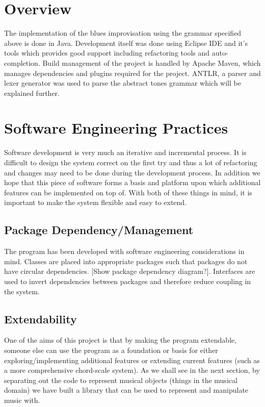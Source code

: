 \documentclass[pdftex,12pt,a4paper]{report}
\begin{document}
\section{Overview}
The implementation of the blues improvisation using the grammar specified above is done in Java. Development itself was done using Eclipse IDE and it's tools which provides good support including refactoring tools and auto-completion. Build management of the project is handled by Apache Maven, which manages dependencies and plugins required for the project. ANTLR, a parser and lexer generator was used to parse the abstract tones grammar which will be explained further.

\section{Software Engineering Practices}
Software development is very much an iterative and incremental process. It is difficult to design the system correct on the first try and thus a lot of refactoring and changes may need to be done during the development process. In addition we hope that this piece of software forms a basis and platform upon which additional features can be implemented on top of. With both of these things in mind, it is important to make the system flexible and easy to extend. 

\subsection{Package Dependency/Management}
The program has been developed with software engineering considerations in mind. Classes are placed into appropriate packages such that packages do not have circular dependencies. [Show package dependency diagram?]. Interfaces are used to invert dependencies between packages and therefore reduce coupling in the system. 

\subsection{Extendability}
One of the aims of this project is that by making the program extendable, someone else can use the program as a foundation or basis for either exploring/implementing additional features or extending current features (such as a more comprehensive chord-scale system). As we shall see in the next section, by separating out the code to represent musical objects (things in the musical domain) we have built a library that can be used to represent and manipulate music with.
\end{document}
